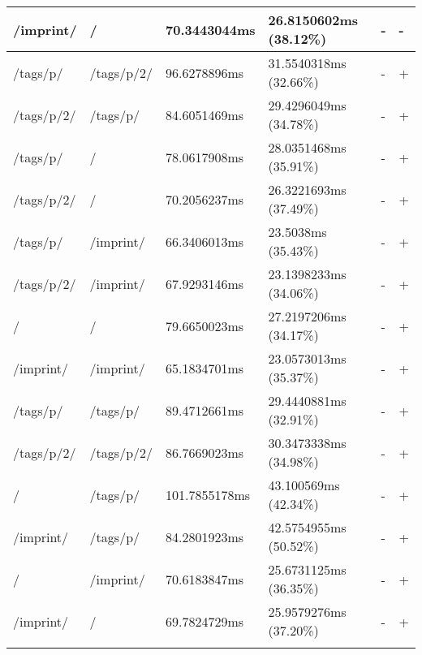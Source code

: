 \begin{appendix}
\begin{center}
\begin{longtable}{llllll}
	/imprint/ & / & 70.3443044ms & 26.8150602ms (38.12\%) & - & - \\
	\hline
	\hline
	/tags/p/ & /tags/p/2/ & 96.6278896ms & 31.5540318ms (32.66\%) & - & + \\
	/tags/p/2/ & /tags/p/ & 84.6051469ms & 29.4296049ms (34.78\%) & - & + \\
	\hline
	/tags/p/ & / & 78.0617908ms & 28.0351468ms (35.91\%) & - & + \\
	/tags/p/2/ & / & 70.2056237ms & 26.3221693ms (37.49\%) & - & + \\
	/tags/p/ & /imprint/ & 66.3406013ms & 23.5038ms (35.43\%) & - & + \\
	/tags/p/2/ & /imprint/ & 67.9293146ms & 23.1398233ms (34.06\%) & - & + \\
	\hline
	/ & / & 79.6650023ms & 27.2197206ms (34.17\%) & - & + \\
	/imprint/ & /imprint/ & 65.1834701ms & 23.0573013ms (35.37\%) & - & + \\
	/tags/p/ & /tags/p/ & 89.4712661ms & 29.4440881ms (32.91\%) & - & + \\
	/tags/p/2/ & /tags/p/2/ & 86.7669023ms & 30.3473338ms (34.98\%) & - & + \\
	\hline
	/ & /tags/p/ & 101.7855178ms & 43.100569ms (42.34\%) & - & + \\
	/imprint/ & /tags/p/ & 84.2801923ms & 42.5754955ms (50.52\%) & - & + \\
	\hline
	/ & /imprint/ & 70.6183847ms & 25.6731125ms (36.35\%) & - & + \\
	/imprint/ & / & 69.7824729ms & 25.9579276ms (37.20\%) & - & + \\
	\hline
\label{tab:selenium_benchmark_results_local}
\end{longtable}
\end{center}

\newpage{}


\end{appendix}
